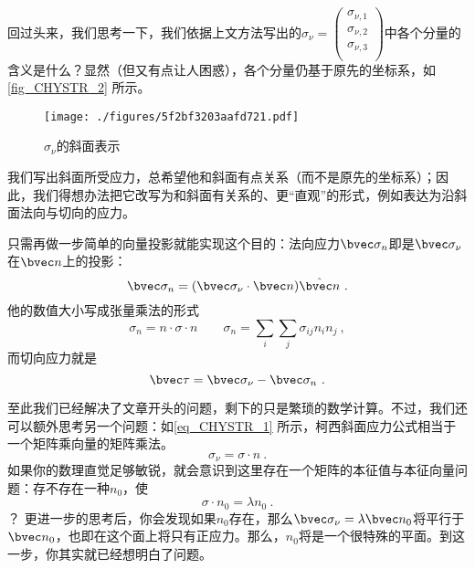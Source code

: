 回过头来，我们思考一下，我们依据上文方法写出的$\sigma_\nu=
\begin{pmatrix}
\sigma_{\nu,1}\\
\sigma_{\nu,2}\\
\sigma_{\nu,3}\\
\end{pmatrix}$中各个分量的含义是什么？显然（但又有点让人困惑），各个分量仍基于原先的坐标系，如\autoref{fig_CHYSTR_2} 所示。

\begin{figure}[ht]
\centering
\texttt{[image: ./figures/5f2bf3203aafd721.pdf]}
\caption{$\sigma_\nu$的斜面表示} \label{fig_CHYSTR_3}
\end{figure}

我们写出斜面所受应力，总希望他和斜面有点关系（而不是原先的坐标系）；因此，我们得想办法把它改写为和斜面有关系的、更“直观”的形式，例如表达为沿斜面法向与切向的应力。

只需再做一步简单的向量投影就能实现这个目的：法向应力$\bvec \sigma_n$即是$\bvec \sigma_\nu$在$\bvec n$上的投影：
\begin{equation}
\bvec \sigma_n = (\bvec \sigma_\nu \cdot \bvec n)  \hat{\bvec n}~.
\end{equation}
他的数值大小写成张量乘法的形式
\begin{equation}
\sigma_n = n \cdot \sigma \cdot n 
\qquad \sigma_n =\sum_i \sum_j \sigma_{ij} n_i n_j~,
\end{equation}
而切向应力就是
\begin{equation}
\bvec \tau = \bvec \sigma_\nu - \bvec \sigma_n~.
\end{equation}

至此我们已经解决了文章开头的问题，剩下的只是繁琐的数学计算。不过，我们还可以额外思考另一个问题：如\autoref{eq_CHYSTR_1} 所示，柯西斜面应力公式相当于一个矩阵乘向量的矩阵乘法。
$$\sigma_\nu = \sigma \cdot n~.$$
如果你的数理直觉足够敏锐，就会意识到这里存在一个矩阵的本征值与本征向量问题：存不存在一种$n_0$，使
$$
\sigma \cdot n_0 = \lambda n_0~.
$$？
更进一步的思考后，你会发现如果$n_0$存在，那么$\bvec \sigma_\nu = \lambda \bvec n_0$将平行于$\bvec n_0$，也即在这个面上将只有正应力。那么，$n_0$将是一个很特殊的平面。到这一步，你其实就已经想明白了问题。

